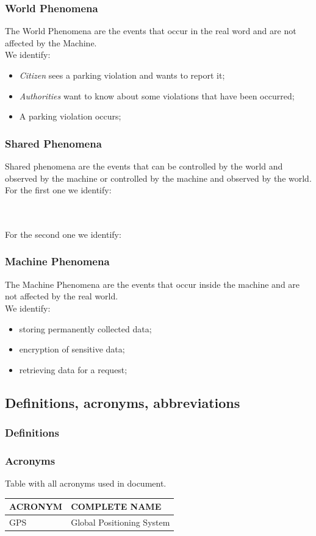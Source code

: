 \documentclass{article}
\begin{document}
\subsubsection{World Phenomena}
The World Phenomena are the events that occur in the real word and are not affected by the Machine.
\\We identify:
\begin{itemize}
    \item \textit{Citizen} sees a parking violation and wants to report it;
    \item \textit{Authorities} want to know about some violations that have been occurred;
    \item A parking violation occurs; 
\end{itemize} 
\subsubsection{Shared Phenomena}
Shared phenomena are the events that can be controlled by the world and observed by the machine or controlled by the machine and observed by the world.
\\For the first one we identify:

\\\\For the second one we identify:

\subsubsection{Machine Phenomena}
The Machine Phenomena are the events that occur inside the machine and are not affected by the real world.
\\We identify:
\begin{itemize}
    \item storing permanently collected data;
    \item encryption of sensitive data;
    \item retrieving data for a request; 
\end{itemize} 
\subsection{Definitions, acronyms, abbreviations}
\subsubsection{Definitions}

\subsubsection{Acronyms}
Table with all acronyms used in document.
\begin{center}
\begin{tabular}{ | l | l |}
    \hline
    ACRONYM & COMPLETE NAME \\
    \hline
    GPS & Global Positioning System  \\
    \hline
\end{tabular}
\end{center}
\end{document}
